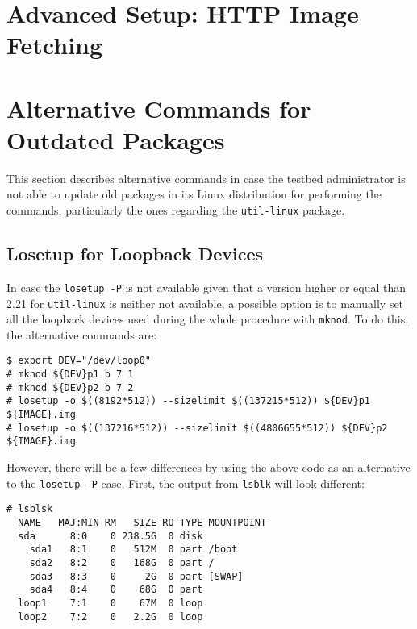 \section{Advanced Setup: HTTP Image Fetching}
\label{sec:http}



\section{Alternative Commands for Outdated Packages}
This section describes alternative commands in case the testbed administrator
is not able to update old packages in its Linux distribution for performing
the commands, particularly the ones regarding the \texttt{util-linux} package.

\subsection{Losetup for Loopback Devices}
\label{sec:alternative_losetup}

In case the \texttt{losetup -P} is not available given that a version
higher or equal than 2.21 for \texttt{util-linux} is neither not available,
a possible option is to manually set all the loopback devices used during the
whole procedure with \texttt{mknod}. To do this, the alternative commands are:

\begin{lstlisting}[]
$ export DEV="/dev/loop0"
# mknod ${DEV}p1 b 7 1
# mknod ${DEV}p2 b 7 2
# losetup -o $((8192*512)) --sizelimit $((137215*512)) ${DEV}p1 ${IMAGE}.img
# losetup -o $((137216*512)) --sizelimit $((4806655*512)) ${DEV}p2 ${IMAGE}.img
\end{lstlisting}
\FloatBarrier
\vspace{-5mm}

However, there will be a few differences by using the above code as an
alternative to the \texttt{losetup -P} case. First, the output from
\texttt{lsblk} will look different:

\begin{lstlisting}[]
# lsblsk
  NAME   MAJ:MIN RM   SIZE RO TYPE MOUNTPOINT
  sda      8:0    0 238.5G  0 disk
    sda1   8:1    0   512M  0 part /boot
    sda2   8:2    0   168G  0 part /
    sda3   8:3    0     2G  0 part [SWAP]
    sda4   8:4    0    68G  0 part
  loop1    7:1    0    67M  0 loop
  loop2    7:2    0   2.2G  0 loop
\end{lstlisting}
\FloatBarrier
\vspace{-5mm}

